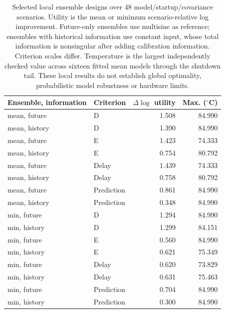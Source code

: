 \begin{table}[tbp]
\centering\small
\begin{tabular}{llrr}
\toprule
Ensemble, information & Criterion & $\Delta\log$ utility & Max. (${}^\circ$C) \\
\midrule
mean, future & D & 1.508 & 84.990 \\
mean, history & D & 1.390 & 84.990 \\
mean, future & E & 1.423 & 74.333 \\
mean, history & E & 0.754 & 80.792 \\
mean, future & Delay & 1.439 & 74.333 \\
mean, history & Delay & 0.758 & 80.792 \\
mean, future & Prediction & 0.861 & 84.990 \\
mean, history & Prediction & 0.348 & 84.990 \\
min, future & D & 1.294 & 84.990 \\
min, history & D & 1.299 & 84.151 \\
min, future & E & 0.560 & 84.990 \\
min, history & E & 0.621 & 75.349 \\
min, future & Delay & 0.620 & 73.829 \\
min, history & Delay & 0.631 & 75.463 \\
min, future & Prediction & 0.704 & 84.990 \\
min, history & Prediction & 0.300 & 84.990 \\
\bottomrule
\end{tabular}
\caption{Selected local ensemble designs over 48 model/startup/covariance scenarios. Utility is the mean or minimum scenario-relative log improvement. Future-only ensembles use multisine as reference; ensembles with historical information use constant input, whose total information is nonsingular after adding calibration information. Criterion scales differ. Temperature is the largest independently checked value across sixteen fitted mean models through the shutdown tail. These local results do not establish global optimality, probabilistic model robustness or hardware limits.}
\label{tab:parameter-design}
\end{table}
